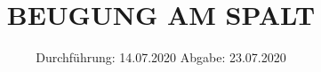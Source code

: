 

\subject{V406}
\title{BEUGUNG AM SPALT}
\date{%
  Durchführung: 14.07.2020
  \hspace{3em}
  Abgabe: 23.07.2020
}



\maketitle
\thispagestyle{empty}
\tableofcontents
\newpage






\printbibliography{}


